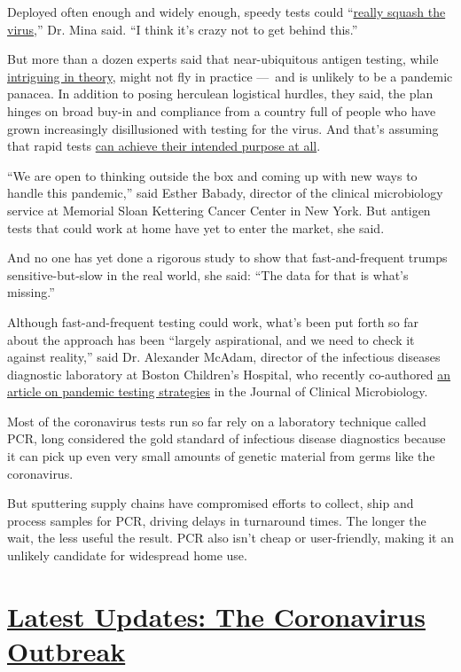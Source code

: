 Deployed often enough and widely enough, speedy tests could
``\href{https://www.nytimes3xbfgragh.onion/2020/07/03/opinion/coronavirus-tests.html}{really
squash the virus},'' Dr. Mina said. ``I think it's crazy not to get
behind this.''

But more than a dozen experts said that near-ubiquitous antigen testing,
while
\href{https://www.medrxiv.org/content/10.1101/2020.06.22.20136309v2}{intriguing
in theory}, might not fly in practice ---~and is unlikely to be a
pandemic panacea. In addition to posing herculean logistical hurdles,
they said, the plan hinges on broad buy-in and compliance from a country
full of people who have grown increasingly disillusioned with testing
for the virus. And that's assuming that rapid tests
\href{https://jcm.asm.org/content/early/2020/08/07/JCM.01695-20}{can
achieve their intended purpose at all}.

``We are open to thinking outside the box and coming up with new ways to
handle this pandemic,'' said Esther Babady, director of the clinical
microbiology service at Memorial Sloan Kettering Cancer Center in New
York. But antigen tests that could work at home have yet to enter the
market, she said.

And no one has yet done a rigorous study to show that fast-and-frequent
trumps sensitive-but-slow in the real world, she said: ``The data for
that is what's missing.''

Although fast-and-frequent testing could work, what's been put forth so
far about the approach has been ``largely aspirational, and we need to
check it against reality,'' said Dr. Alexander McAdam, director of the
infectious diseases diagnostic laboratory at Boston Children's Hospital,
who recently co-authored
\href{https://jcm.asm.org/content/early/2020/08/24/JCM.02225-20}{an
article on pandemic testing strategies} in the Journal of Clinical
Microbiology.

Most of the coronavirus tests run so far rely on a laboratory technique
called PCR, long considered the gold standard of infectious disease
diagnostics because it can pick up even very small amounts of genetic
material from germs like the coronavirus.

But sputtering supply chains have compromised efforts to collect, ship
and process samples for PCR, driving delays in turnaround times. The
longer the wait, the less useful the result. PCR also isn't cheap or
user-friendly, making it an unlikely candidate for widespread home use.

\hypertarget{latest-updates-the-coronavirus-outbreak}{%
\section{\texorpdfstring{\href{https://www.nytimes3xbfgragh.onion/2020/09/11/world/covid-19-coronavirus.html?action=click\&pgtype=Article\&state=default\&region=MAIN_CONTENT_1\&context=storylines_live_updates}{Latest
Updates: The Coronavirus
Outbreak}}{Latest Updates: The Coronavirus Outbreak}}\label{latest-updates-the-coronavirus-outbreak}}

